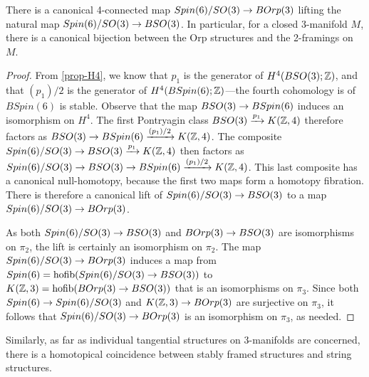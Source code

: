 \documentclass{amsart}
\begin{document}
\begin{proposition}
There is a canonical 4-connected map $Spin(6)/SO(3) \rightarrow BOrp(3)$ lifting the natural map $Spin(6)/SO(3) \rightarrow BSO(3)$.  In particular, for a closed 3-manifold $M$, there is a canonical bijection between the Orp structures and the 2-framings on $M$. 
\end{proposition}
\begin{proof}
From \cref{prop-H4}, we know that $p_1$ is the generator of $H^4(BSO(3);\mathbb Z)$, and that $(p_1)/2$ is the generator of $H^4(BSpin(6);\mathbb Z)$---the fourth cohomology is of $BSpin(6)$ is stable.  Observe that the map $BSO(3) \rightarrow BSpin(6)$ induces an isomorphism on $H^4$.  The first Pontryagin class $BSO(3) \xrightarrow{p_1} K(\mathbb Z,4)$ therefore factors as $BSO(3) \rightarrow BSpin(6) \xrightarrow{(p_1)/2} K(\mathbb Z,4)$.  The composite $Spin(6)/SO(3) \rightarrow BSO(3) \xrightarrow{p_1} K(\mathbb Z,4)$ then factors as $Spin(6)/SO(3) \rightarrow BSO(3) \rightarrow BSpin(6) \xrightarrow{(p_1)/2} K(\mathbb Z,4)$.  This last composite has a canonical null-homotopy, because the first two maps form a homotopy fibration.  There is therefore a canonical lift of $Spin(6)/SO(3) \rightarrow BSO(3)$ to a map $Spin(6)/SO(3) \rightarrow BOrp(3)$.

As both $Spin(6)/SO(3) \rightarrow BSO(3)$ and $BOrp(3) \rightarrow BSO(3)$ are isomorphisms on $\pi_2$, the lift is certainly an isomorphism on $\pi_2$.  The map $Spin(6)/SO(3) \rightarrow BOrp(3)$ induces a map from $Spin(6) = \operatorname{hofib}(Spin(6)/SO(3) \rightarrow BSO(3))$ to $K(\mathbb Z,3) = \operatorname{hofib}(BOrp(3) \rightarrow BSO(3))$ that is an isomorphisms on $\pi_3$.  Since both $Spin(6) \rightarrow Spin(6)/SO(3)$ and $K(\mathbb Z,3) \rightarrow BOrp(3)$ are surjective on $\pi_3$, it follows that $Spin(6)/SO(3) \rightarrow BOrp(3)$ is an isomorphism on $\pi_3$, as needed.
\end{proof} %

Similarly, as far as individual tangential structures on 3-manifolds are concerned, there is a homotopical coincidence between stably framed structures and string structures.
\end{document}
